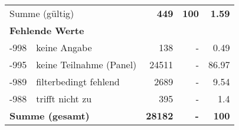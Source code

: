 \begin{longtable}{lXrrr}
     \midrule
     \multicolumn{2}{l}{Summe (gültig)} &
       \textbf{\num{449}} &
     \textbf{\num{100}} &
       \textbf{\num[round-mode=places,round-precision=2]{1.59}} \\
     \multicolumn{5}{l}{\textbf{Fehlende Werte}}\\
       -998 &
       keine Angabe &
         \num{138} &
        - &
         \num[round-mode=places,round-precision=2]{0.49} \\
       -995 &
       keine Teilnahme (Panel) &
         \num{24511} &
        - &
         \num[round-mode=places,round-precision=2]{86.97} \\
       -989 &
       filterbedingt fehlend &
         \num{2689} &
        - &
         \num[round-mode=places,round-precision=2]{9.54} \\
       -988 &
       trifft nicht zu &
         \num{395} &
        - &
         \num[round-mode=places,round-precision=2]{1.4} \\
     \midrule
     \multicolumn{2}{l}{\textbf{Summe (gesamt)}} &
          \textbf{\num{28182}} &
        \textbf{-} &
        \textbf{\num{100}} \\
     \bottomrule
     \end{longtable}
     
